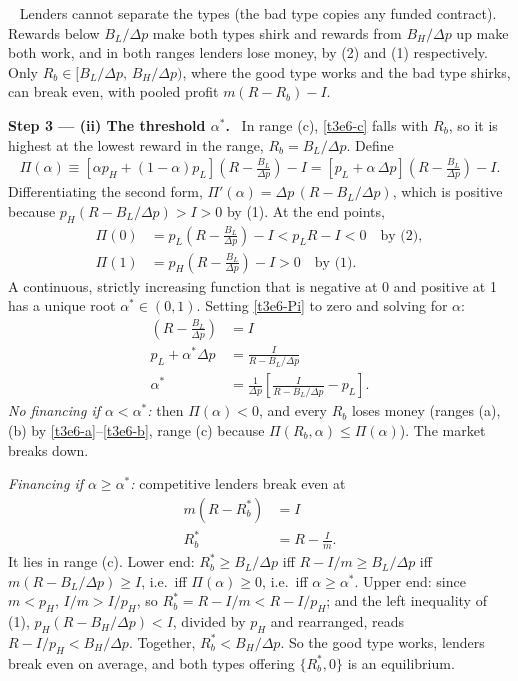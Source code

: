 \documentclass[11pt,a4paper]{article}
\newcommand{\step}[2]{\par\medskip\noindent\textbf{Step #1 --- #2.}~}
\newcommand{\answer}[1]{\par\smallskip\noindent\fbox{\textbf{Answer #1.}}~}
\begin{document}
\answer{(i)} Lenders cannot separate the types (the bad type copies any funded contract). Rewards below $B_L/\Delta p$ make both types shirk and rewards from $B_H/\Delta p$ up make both work, and in both ranges lenders lose money, by (2) and (1) respectively. Only $R_b\in[B_L/\Delta p,\,B_H/\Delta p)$, where the good type works and the bad type shirks, can break even, with pooled profit $m(R-R_b)-I$.

\step{3}{(ii) The threshold $\alpha^*$} In range (c), \eqref{t3e6-c} falls with $R_b$, so it is highest at the lowest reward in the range, $R_b=B_L/\Delta p$. Define
\begin{align}
  \Pi(\alpha) \equiv [\alpha p_H+(1-\alpha)p_L]\left(R-\frac{B_L}{\Delta p}\right) - I
   = [p_L+\alpha\,\Delta p]\left(R-\frac{B_L}{\Delta p}\right) - I. \label{t3e6-Pi}
\end{align}
Differentiating the second form, $\Pi'(\alpha)=\Delta p\,(R-B_L/\Delta p)$, which is positive because $p_H(R-B_L/\Delta p)>I>0$ by (1). At the end points,
\begin{align}
  \Pi(0) &= p_L\left(R-\frac{B_L}{\Delta p}\right)-I < p_LR-I < 0 \quad\text{by (2)}, \nonumber\\
  \Pi(1) &= p_H\left(R-\frac{B_L}{\Delta p}\right)-I > 0 \quad\text{by (1)}. \nonumber
\end{align}
A continuous, strictly increasing function that is negative at 0 and positive at 1 has a unique root $\alpha^*\in(0,1)$. Setting \eqref{t3e6-Pi} to zero and solving for $\alpha$:
\begin{align}
  [p_L+\alpha^*\Delta p]\left(R-\frac{B_L}{\Delta p}\right) &= I \nonumber\\
  p_L+\alpha^*\Delta p &= \frac{I}{R-B_L/\Delta p} \nonumber\\
  \alpha^* &= \frac{1}{\Delta p}\left[\frac{I}{R-B_L/\Delta p}-p_L\right]. \label{t3e6-astar}
\end{align}
\textit{No financing if $\alpha<\alpha^*$:} then $\Pi(\alpha)<0$, and every $R_b$ loses money (ranges (a), (b) by \eqref{t3e6-a}--\eqref{t3e6-b}, range (c) because $\Pi(R_b,\alpha)\le\Pi(\alpha)$). The market breaks down.

\textit{Financing if $\alpha\ge\alpha^*$:} competitive lenders break even at
\begin{align}
  m(R-R_b^*) &= I \nonumber\\
  R_b^* &= R-\frac{I}{m}. \label{t3e6-Rbstar}
\end{align}
It lies in range (c). Lower end: $R_b^*\ge B_L/\Delta p$ iff $R-I/m\ge B_L/\Delta p$ iff $m(R-B_L/\Delta p)\ge I$, i.e.\ iff $\Pi(\alpha)\ge0$, i.e.\ iff $\alpha\ge\alpha^*$. Upper end: since $m<p_H$, $I/m>I/p_H$, so $R_b^*=R-I/m<R-I/p_H$; and the left inequality of (1), $p_H(R-B_H/\Delta p)<I$, divided by $p_H$ and rearranged, reads $R-I/p_H<B_H/\Delta p$. Together, $R_b^*<B_H/\Delta p$. So the good type works, lenders break even on average, and both types offering $\{R_b^*,0\}$ is an equilibrium.
\end{document}
